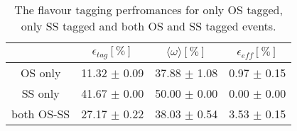 \begin{table}[h]
\centering
\caption{The flavour tagging perfromances for only OS tagged, only SS tagged and both OS and SS tagged events.}
\begin{tabular}{c c c c}
\hline
\hline
 & $\epsilon_{tag} [\%]$ & $\langle \omega \rangle [\%] $ & $\epsilon_{eff} [\%]$ \\
\hline
OS only & 11.32 $\pm$ 0.09 & 37.88 $\pm$ 1.08 & 0.97 $\pm$ 0.15\\
SS only & 41.67 $\pm$ 0.00 & 50.00 $\pm$ 0.00 & 0.00 $\pm$ 0.00\\
both OS-SS & 27.17 $\pm$ 0.22 & 38.03 $\pm$ 0.54 & 3.53 $\pm$ 0.15\\
\hline
\hline
\end{tabular}
\label{table:tagging}
\end{table}